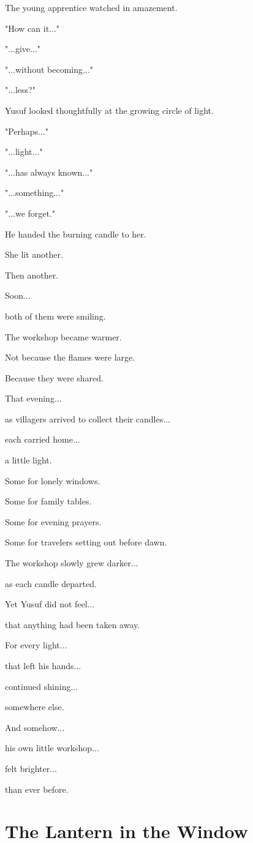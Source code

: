 \documentclass[12pt,openany]{book}
\begin{document}
The young apprentice watched in amazement.

"How can it..."

"...give..."

"...without becoming..."

"...less?"

Yusuf looked thoughtfully at the growing circle of light.

"Perhaps..."

"...light..."

"...has always known..."

"...something..."

"...we forget."

He handed the burning candle to her.

She lit another.

Then another.

Soon...

both of them were smiling.

The workshop became warmer.

Not because the flames were large.

Because they were shared.

That evening...

as villagers arrived to collect their candles...

each carried home...

a little light.

Some for lonely windows.

Some for family tables.

Some for evening prayers.

Some for travelers setting out before dawn.

The workshop slowly grew darker...

as each candle departed.

Yet Yusuf did not feel...

that anything had been taken away.

For every light...

that left his hands...

continued shining...

somewhere else.

And somehow...

his own little workshop...

felt brighter...

than ever before.
\section*{The Lantern in the Window}
\end{document}

